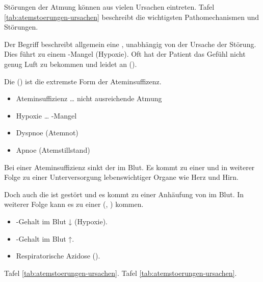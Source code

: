 {
Störungen der Atmung können aus vielen Ursachen eintreten. Tafel
\ref{tab:atemstoerungen-ursachen} beschreibt die wichtigsten Pathomechanismen
und Störungen. 

Der Begriff
beschreibt allgemein eine , unabhängig von der Ursache der Störung. Dies führt zu einem -Mangel (Hypoxie). Oft hat der Patient das Gefühl nicht genug
Luft zu bekommen und leidet an  ().

Die  () ist die extremste Form der
Ateminsuffizenz.
}{
\begin{itemize}
  \item Ateminsuffizienz \ldots{} nicht ausreichende Atmung
  \item Hypoxie \ldots{} -Mangel
  \item Dyspnoe (Atemnot)
  \item Apnoe (Atemstillstand)
\end{itemize}
}{}{}{}


{
Bei einer Ateminsuffizienz sinkt der  im Blut. Es kommt zu
einer  und in weiterer Folge zu einer Unterversorgung
lebenswichtiger Organe wie Herz und Hirn. 

Doch auch die  ist gestört und es kommt zu einer Anhäufung
von  im Blut. In weiterer Folge kann es zu einer  (, 
) kommen.
}{
\begin{itemize}
    \item {}-Gehalt im Blut ↓ (Hypoxie).
    \item {}-Gehalt im Blut ↑.
    \item Respiratorische Azidose ().
\end{itemize}
}{}{}{}




{
Tafel \ref{tab:atemstoerungen-ursachen}.
}{Tafel \ref{tab:atemstoerungen-ursachen}.}{}{}{}


